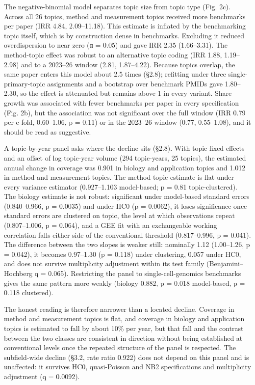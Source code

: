 \documentclass[11pt]{article}
\begin{document}
The negative-binomial model separates topic size from topic type (Fig.
2c). Across all 26 topics, method and measurement topics received more
benchmarks per paper (IRR 4.84, 2.09--11.18). This estimate is inflated
by the benchmarking topic itself, which is by construction dense in
benchmarks. Excluding it reduced overdispersion to near zero (α = 0.05)
and gave IRR 2.35 (1.66--3.31). The method-topic effect was robust to an
alternative topic coding (IRR 1.88, 1.19--2.98) and to a 2023--26 window
(2.81, 1.87--4.22). Because topics overlap, the same paper enters this
model about 2.5 times (§2.8); refitting under three single-primary-topic
assignments and a bootstrap over benchmark PMIDs gave 1.80--2.30, so the
effect is attenuated but remains above 1 in every variant. Share growth
was associated with fewer benchmarks per paper in every specification
(Fig. 2b), but the association was not significant over the full window
(IRR 0.79 per e-fold, 0.60--1.06, p = 0.11) or in the 2023--26 window
(0.77, 0.55--1.08), and it should be read as suggestive.

A topic-by-year panel asks where the decline sits (§2.8). With topic
fixed effects and an offset of log topic-year volume (294 topic-years,
25 topics), the estimated annual change in coverage was 0.901 in biology
and application topics and 1.012 in method and measurement topics. The
method-topic estimate is flat under every variance estimator
(0.927--1.103 model-based; p = 0.81 topic-clustered). The biology
estimate is not robust: significant under model-based standard errors
(0.840--0.966, p = 0.0035) and under HC0 (p = 0.0062), it loses
significance once standard errors are clustered on topic, the level at
which observations repeat (0.807--1.006, p = 0.064), and a GEE fit with
an exchangeable working correlation falls either side of the
conventional threshold (0.817--0.996, p = 0.041). The difference between
the two slopes is weaker still: nominally 1.12 (1.00--1.26, p = 0.042),
it becomes 0.97--1.30 (p = 0.118) under clustering, 0.057 under HC0, and
does not survive multiplicity adjustment within its test family
(Benjamini--Hochberg q = 0.065). Restricting the panel to
single-cell-genomics benchmarks gives the same pattern more weakly
(biology 0.882, p = 0.018 model-based, p = 0.118 clustered).

The honest reading is therefore narrower than a located decline.
Coverage in method and measurement topics is flat, and coverage in
biology and application topics is estimated to fall by about 10\% per
year, but that fall and the contrast between the two classes are
consistent in direction without being established at conventional levels
once the repeated structure of the panel is respected. The subfield-wide
decline (§3.2, rate ratio 0.922) does not depend on this panel and is
unaffected: it survives HC0, quasi-Poisson and NB2 specifications and
multiplicity adjustment (q = 0.0092).
\end{document}
